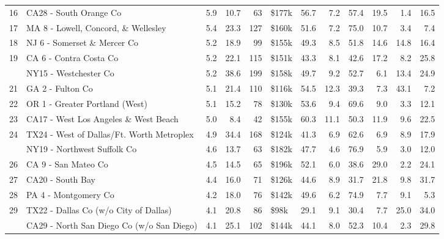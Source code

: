 \begin{table}
\begin{tabular}[t]{llrrrlrrrrrr}
16 & CA28 - South Orange Co & 5.9 & 10.7 & 63 & \$177k & 56.7 & 7.2 & 57.4 & 19.5 & 1.4 & 16.5\\
17 & MA 8 - Lowell, Concord, \& Wellesley & 5.4 & 23.3 & 127 & \$160k & 51.6 & 7.2 & 75.0 & 10.7 & 3.4 & 7.4\\
18 & NJ 6 - Somerset \& Mercer Co & 5.2 & 18.9 & 99 & \$155k & 49.3 & 8.5 & 51.8 & 14.6 & 14.8 & 16.4\\
19 & CA 6 - Contra Costa Co & 5.2 & 22.1 & 115 & \$151k & 43.3 & 8.1 & 42.6 & 17.2 & 8.2 & 25.8\\
\addlinespace
20 & NY15 - Westchester Co & 5.2 & 38.6 & 199 & \$158k & 49.7 & 9.2 & 52.7 & 6.1 & 13.4 & 24.9\\
21 & GA 2 - Fulton Co & 5.1 & 21.4 & 110 & \$116k & 54.5 & 12.3 & 39.3 & 7.3 & 43.1 & 7.2\\
22 & OR 1 - Greater Portland (West) & 5.1 & 15.2 & 78 & \$130k & 53.6 & 9.4 & 69.6 & 9.0 & 3.3 & 12.1\\
23 & CA17 - West Los Angeles \& West Beach & 5.0 & 8.4 & 42 & \$155k & 60.3 & 11.1 & 50.3 & 11.9 & 9.6 & 22.5\\
24 & TX24 - West of Dallas/Ft. Worth Metroplex & 4.9 & 34.4 & 168 & \$124k & 41.3 & 6.9 & 62.6 & 6.9 & 8.9 & 17.9\\
\addlinespace
25 & NY19 - Northwest Suffolk Co & 4.6 & 13.7 & 63 & \$182k & 47.7 & 4.6 & 76.9 & 5.9 & 3.0 & 12.0\\
26 & CA 9 - San Mateo Co & 4.5 & 14.5 & 65 & \$196k & 52.1 & 6.0 & 38.6 & 29.0 & 2.2 & 24.1\\
27 & CA20 - South Bay & 4.4 & 16.0 & 71 & \$126k & 44.6 & 8.9 & 31.7 & 21.8 & 9.8 & 31.7\\
28 & PA 4 - Montgomery Co & 4.2 & 18.0 & 76 & \$142k & 49.6 & 6.2 & 74.9 & 7.7 & 9.1 & 5.3\\
29 & TX22 - Dallas Co (w/o City of Dallas) & 4.1 & 20.8 & 86 & \$98k & 29.1 & 9.1 & 30.4 & 7.7 & 25.0 & 34.0\\
\addlinespace
30 & CA29 - North San Diego Co (w/o San Diego) & 4.1 & 25.1 & 102 & \$144k & 44.1 & 8.0 & 52.3 & 10.4 & 2.3 & 29.8\\
\bottomrule
\end{tabular}
\end{table}
